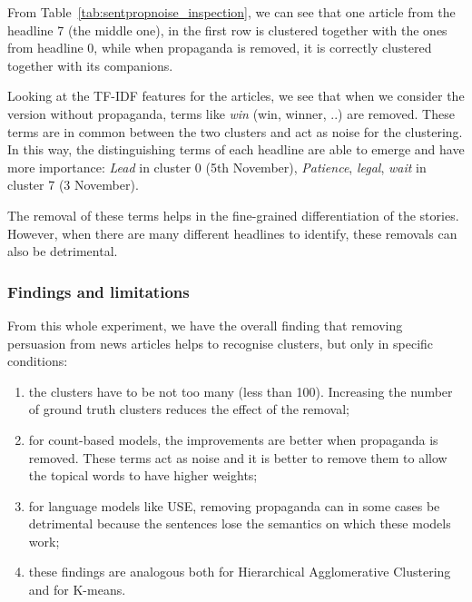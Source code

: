 

From Table~\ref{tab:sentpropnoise_inspection}, we can see that one article from the headline 7 (the middle one), in the first row is clustered together with the ones from headline 0, while when propaganda is removed, it is correctly clustered together with its companions.

Looking at the TF-IDF features for the articles, we see that when we consider the version without propaganda, terms like \emph{win} (win, winner, ..) are removed. These terms are in common between the two clusters and act as noise for the clustering.
In this way, the distinguishing terms of each headline are able to emerge and have more importance:
\emph{Lead} in cluster 0 (5th November), 
\emph{Patience}, \emph{legal}, \emph{wait} in cluster 7 (3 November).

The removal of these terms helps in the fine-grained differentiation of the stories.
However, when there are many different headlines to identify, these removals can also be detrimental.


\subsubsection{Findings and limitations} %
\label{ssec:lp_relationship_removing_findings}

From this whole experiment, we have the overall finding that removing persuasion from news articles helps to recognise clusters, but only in specific conditions:
\begin{enumerate}
    \item the clusters have to be not too many (less than 100). Increasing the number of ground truth clusters reduces the effect of the removal;
    \item for count-based models, the improvements are better when propaganda is removed. These terms act as noise and it is better to remove them to allow the topical words to have higher weights;
    \item for language models like USE, removing propaganda can in some cases be detrimental because the sentences lose the semantics on which these models work;
    \item these findings are analogous both for Hierarchical Agglomerative Clustering and for K-means.
\end{enumerate}

